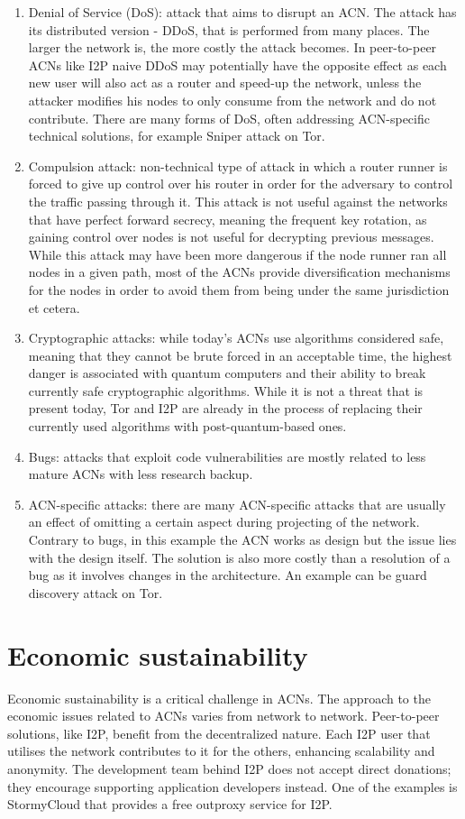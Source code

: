 \begin{enumerate}
    \item Denial of Service (DoS): attack that aims to disrupt an ACN. The attack has its distributed version - DDoS, that is performed from many places. The larger the network is, the more costly the attack becomes. In peer-to-peer ACNs like I2P naive DDoS may potentially have the opposite effect as each new user will also act as a router and speed-up the network, unless the attacker modifies his nodes to only consume from the network and do not contribute. There are many forms of DoS, often addressing ACN-specific technical solutions, for example Sniper attack \cite{sniper} on Tor.
    \item Compulsion attack: non-technical type of attack in which a router runner is forced to give up control over his router in order for the adversary to control the traffic passing through it. This attack is not useful against the networks that have perfect forward secrecy, meaning the frequent key rotation, as gaining control over nodes is not useful for decrypting previous messages. While this attack may have been more dangerous if the node runner ran all nodes in a given path, most of the ACNs provide diversification mechanisms for the nodes in order to avoid them from being under the same jurisdiction et cetera.
    \item Cryptographic attacks: while today's ACNs use algorithms considered safe, meaning that they cannot be brute forced in an acceptable time, the highest danger is associated with quantum computers and their ability to break currently safe cryptographic algorithms. While it is not a threat that is present today, Tor and I2P are already in the process of replacing their currently used algorithms with post-quantum-based ones.
    \item Bugs: attacks that exploit code vulnerabilities are mostly related to less mature ACNs with less research backup.
    \item ACN-specific attacks: there are many ACN-specific attacks that are usually an effect of omitting a certain aspect during projecting of the network. Contrary to bugs, in this example the ACN works as design but the issue lies with the design itself. The solution is also more costly than a resolution of a bug as it involves changes in the architecture. An example can be guard discovery attack \cite{guard-discovery} on Tor.
\end{enumerate}

\section{Economic sustainability}
Economic sustainability is a critical challenge in ACNs. The approach to the economic issues related to ACNs varies from network to network. Peer-to-peer solutions, like I2P, benefit from the decentralized nature. Each I2P user that utilises the network contributes to it for the others, enhancing scalability and anonymity. The development team behind I2P does not accept direct donations; they encourage supporting application developers instead. One of the examples is StormyCloud that provides a free outproxy service for I2P.


